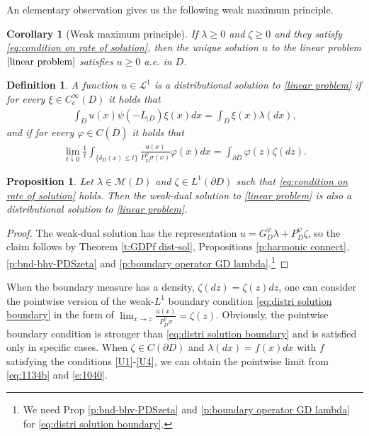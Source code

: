 \documentclass[12pt,a4paper,onecolumn]{article}
\newtheorem{prop}[thm]{Proposition}
\newtheorem{cor}[thm]{Corollary}
\newtheorem{defn}[thm]{Definition}
\theoremstyle{definition}
\newcommand{\1}{\mathbf 1}
\newcommand{\de}{\delta_D}
\newcommand{\MM}{\mathcal{M}}
\newcommand{\calL}{\mathcal{L}^1}
\newcommand{\Lo}{\psi(-L_{|D})}
\newcommand{\GDP}{G_D^\psi}
\newcommand{\PDS}{P^{\psi}_{ D}}
\numberwithin{equation}{section}
\begin{document}
An elementary observation gives us the following weak maximum principle.
	\begin{cor}[Weak maximum principle]\label{c:maximum principle weak solution}
	If $\lambda\ge0$ and $\zeta\ge0$ and they satisfy \eqref{eq:condition on rate of solution}, then the unique solution $u$ to the linear problem $\eqref{linear problem}$ satisfies $u\ge0$ a.e. in $D$.
	\end{cor}
	
	
	
	
	
	\begin{defn}\label{r:defn of distributional solution}
        A function $u\in \calL$ is a distributional solution to \eqref{linear problem} if for every $\xi\in C^\infty_c(D)$ it holds that
		\begin{align*}
			\int_D u(x)\Lo\xi(x)dx=\int_D \xi(x)\lambda(dx),
		\end{align*}
		and if for every $\varphi \in C(\overline D)$ it holds that
		\begin{align}\label{eq:distri solution boundary}
			\lim_{t\downarrow 0}\frac1t \int_{\{\de(x)\le t\}}\frac{u(x)}{\PDS\sigma(x)}\varphi(x)dx=\int_{\partial D}\varphi(z)\zeta(dz).
		\end{align}
	\end{defn}
	
	\begin{prop}\label{p:distSol}
		Let $\lambda\in \MM(D)$ and $\zeta\in L^1(\partial D)$ such that \eqref{eq:condition on rate of solution} holds. Then the weak-dual solution to \eqref{linear problem} is also a distributional solution to \eqref{linear problem}.
	\end{prop}
	\begin{proof}
		The weak-dual solution has the representation $u=\GDP \lambda + \PDS\zeta$, so the claim follows by Theorem \ref{t:GDPf dist-sol}, Propositions  \ref{p:harmonic connect}, \ref{p:bnd-bhv-PDSzeta} and \ref{p:boundary operator GD lambda}.\footnote{We need Prop \ref{p:bnd-bhv-PDSzeta} and \ref{p:boundary operator GD lambda} for \eqref{eq:distri solution boundary}.}
	\end{proof}
	
When the boundary measure has a density, $\zeta(dz)=\zeta(z)dz$, one can consider the pointwise version of the weak-$L^1$ boundary condition \eqref{eq:distri solution boundary} in the form of $\lim_{x\to z}\frac{u(x)}{\PDS\sigma}=\zeta(z)$. Obviously, the pointwise boundary condition is stronger than \eqref{eq:distri solution boundary} and is satisfied only in specific cases. When $\zeta\in C(\partial D)$ and $\lambda(dx)=f(x)dx$ with $f$ satisfying the conditions \ref{U1}-\ref{U4}, we can obtain the pointwise limit from \eqref{eq:1134b} and \eqref{e:1040}. 
 
\end{document}
